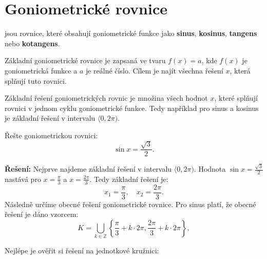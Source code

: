 \documentclass[12pt,a4paper]{article}
\begin{document}
\section{Goniometrické rovnice}

 jsou rovnice, které obsahují goniometrické funkce jako
\textbf{sinus}, \textbf{kosinus}, \textbf{tangens} nebo \textbf{kotangens}.

Základní goniometrické rovnice je zapsaná ve tvaru $f(x) = a$, kde $f(x)$ je goniometrická funkce
a $a$ je reálné číslo. Cílem je najít všechna řešení $x$, která splňují tuto rovnici.

Základní řešení goniometrických rovnic je množina všech hodnot $x$, které splňují rovnici v jednom cyklu goniometrické funkce.
Tedy například pro sinus a kosinus je základní řešení v intervalu $\langle 0, 2\pi)$.

\begin{examplebox}
    Řešte goniometrickou rovnici:
    \[
    \sin x = \frac{\sqrt{3}}{2}.
    \]

    \medskip
    \textbf{Řešení:}
    Nejprve najdeme základní řešení v intervalu $\langle 0, 2\pi)$.
    Hodnota $\sin x = \frac{\sqrt{3}}{2}$ nastává pro $x = \frac{\pi}{3}$ a $x = \frac{2\pi}{3}$.
    Tedy základní řešení je:
    \[
    x_1 = \frac{\pi}{3}, \quad x_2 = \frac{2\pi}{3}.
    \]
    Následně určíme obecné řešení goniometrické rovnice.
    Pro sinus platí, že obecné řešení je dáno vzorcem:
    \[
    K = \bigcup_{k \in \mathbb{Z}}  \left\{ \frac{\pi}{3} + k \cdot 2\pi, \frac{2\pi}{3} + k \cdot 2\pi\right\},
    \]

    Nejlépe je ověřit si řešení na jednotkové kružnici:
    \begin{center}
    \end{center}
\end{examplebox}    
\end{document}

